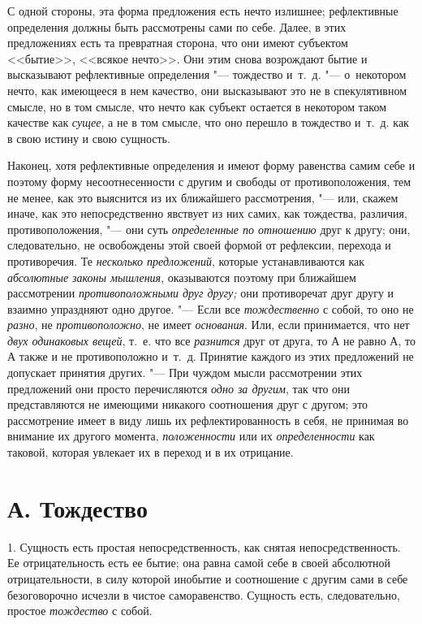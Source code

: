 С одной стороны, эта форма предложения есть нечто излишнее; рефлективные
определения должны быть рассмотрены сами по себе. Далее, в этих
предложениях есть та превратная сторона, что они имеют субъектом <<бытие>>,
<<всякое нечто>>. Они этим снова возрождают бытие и высказывают рефлективные
определения "--- тождество и~т.~д. "--- о~некотором нечто, как имеющееся в нем
качество, они высказывают это не в спекулятивном смысле, но в том смысле,
что нечто как субъект остается в некотором таком качестве как
{\em сущее}, а не в том смысле, что оно перешло в
тождество и~т.~д. как в свою истину и свою сущность.

Наконец, хотя рефлективные определения и имеют форму равенства самим себе и
поэтому форму несоотнесенности с другим и свободы от противоположения, тем
не менее, как это выяснится из их ближайшего рассмотрения, "--- или, скажем
иначе, как это непосредственно явствует из них самих, как тождества,
различия, противоположения, "--- они суть
{\em определенные по отношению }друг к другу; они,
следовательно, не освобождены этой своей формой от рефлексии, перехода и
противоречия. Те {\em несколько предложений}, которые
устанавливаются как {\em абсолютные законы мышления},
оказываются поэтому при ближайшем рассмотрении
{\em противоположными друг другу;} они противоречат
друг другу и взаимно упраздняют одно другое. "--- Если все
{\em тождественно} с собой, то оно не {\em разно}, не
{\em противоположно}, не имеет {\em основания}. Или, если принимается, что нет
{\em двух одинаковых вещей}, т.~е. что все
{\em разнится} друг от друга, то $А$ не равно
$А$, то $А$ также и не противоположно и~т.~д. Принятие
каждого из этих предложений не допускает принятия других. "--- При чуждом
мысли рассмотрении этих предложений они просто перечисляются
{\em одно за другим}, так что они представляются не
имеющими никакого соотношения друг с другом; это рассмотрение имеет в виду
лишь их рефлектированность в себя, не принимая во внимание их другого
момента, {\em положенности} или их
{\em определенности} как таковой, которая увлекает их в
переход и в их отрицание.

\section[А. Тождество]{А. Тождество}
1. Сущность есть простая непосредственность, как
снятая непосредственность. Ее отрицательность есть ее бытие; она равна
самой себе в своей абсолютной отрицательности, в силу которой инобытие и
соотношение с другим сами в себе безоговорочно исчезли в чистое
саморавенство. Сущность есть, следовательно, простое
{\em тождество} с собой.

